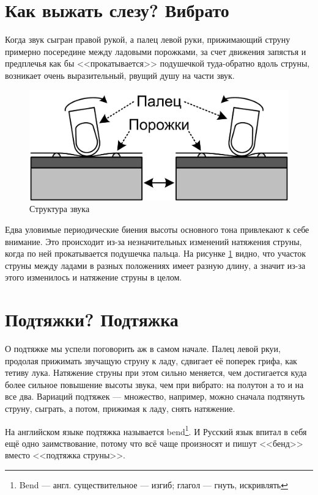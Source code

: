 \section{Как выжать слезу? Вибрато}
\label{ch:tricks:vibrato}

Когда звук сыгран правой рукой, а палец левой руки, прижимающий струну примерно посередине между ладовыми порожками, за счет движения запястья и предплечья как бы <<прокатывается>> подушечкой туда-обратно вдоль струны, возникает очень выразительный, рвущий душу на части звук.  

\begin{figure}[!ht]
    \centering
    \includegraphics{fig/vibrato} 
    \caption{Структура звука}\label{fig:tricks:vibrato}
\end{figure}

Едва уловимые периодические биения высоты основного тона привлекают к себе внимание. Это происходит из-за незначительных изменений натяжения струны, когда по ней прокатывается подушечка пальца. На рисунке \ref{fig:tricks:vibrato} видно, что участок струны между ладами в разных положениях имеет разную длину, а значит из-за этого изменилось и натяжение струны в целом.


\section{Подтяжки? Подтяжка}

О подтяжке мы успели поговорить аж в самом начале. Палец левой ркуи, продолая прижимать звучащую струну к ладу, сдвигает её поперек грифа, как тетиву лука. Натяжение струны при этом сильно меняется, чем достигается куда более сильное повышение высоты звука, чем при вибрато: на полутон а то и на все два. Вариаций подтяжек --- множество, например, можно сначала подтянуть струну, сыграть, а потом, прижимая к ладу, снять натяжение. 

На английском языке подтяжка называется bend\footnote{Bend --- англ. существительное --- изгиб; глагол --- гнуть, искривлять}. И Русский язык впитал в себя ещё одно заимствование, потому что всё чаще произносят и пишут <<бенд>> вместо <<подтяжка струны>>.
